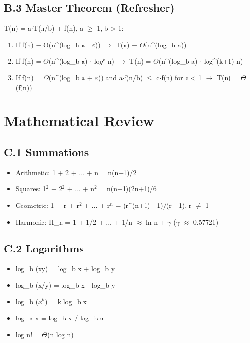 \section{B.3 Master Theorem (Refresher)}

T(n) = a$\cdot $T(n/b) + f(n), a $\ge $ 1, b > 1:

\begin{enumerate}
\item If f(n) = O(n\textasciicircum{}(log\_b a - $\varepsilon $)) $\to $ T(n) = $\Theta $(n\textasciicircum{}(log\_b a))
\item If f(n) = $\Theta $(n\textasciicircum{}(log\_b a) $\cdot $ lo$g^{k}$ n) $\to $ T(n) = $\Theta $(n\textasciicircum{}(log\_b a) $\cdot $ log\textasciicircum{}(k+1) n)
\item If f(n) = $\Omega $(n\textasciicircum{}(log\_b a + $\varepsilon $)) and a$\cdot $f(n/b) $\le $ c$\cdot $f(n) for c < 1 $\to $ T(n) = $\Theta $(f(n))
\end{enumerate}

\bigskip

\chapter{Mathematical Review}\label{appendices:mathematical-review}

\section{C.1 Summations}

\begin{itemize}
\item Arithmetic: 1 + 2 + ... + n = n(n+1)/2
\item Squares: 1$^{2}$ + 2$^{2}$ + ... + n$^{2}$ = n(n+1)(2n+1)/6
\item Geometric: 1 + r + r$^{2}$ + ... + r$^{n}$ = (r\textasciicircum{}(n+1) - 1)/(r - 1), r $\ne $ 1
\item Harmonic: H\_n = 1 + 1/2 + ... + 1/n $\approx $ ln n + $\gamma $ ($\gamma $ $\approx $ 0.57721)
\end{itemize}

\section{C.2 Logarithms}

\begin{itemize}
\item log\_b (xy) = log\_b x + log\_b y
\item log\_b (x/y) = log\_b x - log\_b y
\item log\_b ($x^{k}$) = k log\_b x
\item log\_a x = log\_b x / log\_b a
\item log n! = $\Theta $(n log n)
\end{itemize}

